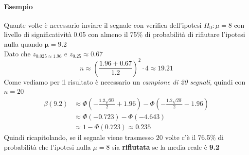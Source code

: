 \documentclass[]{article}
\begin{document}
    \paragraph{Esempio} Quante volte è necessario inviare il segnale con verifica dell'ipotesi $H_0 : \mu = 8$ con livello di significatività 0.05 con almeno il 75\% di probabilità di rifiutare l'ipotesi nulla quando $\boldsymbol{\mu = 9.2}$ \\
    Dato che $z_{0.025 \approx 1.96}$ e $z_{0.25} \approx 0.67$ 
    \[ n \approx \left( \frac{1.96 + 0.67}{1.2} \right)^2 \cdot 4 \approx 19.21 \]
    Come vediamo per il risultato è necessario un \textit{campione di 20 segnali}, quindi con $n=20$
    \begin{equation*}
        \begin{split}
            \beta(9.2) &\approx \Phi \left( - \frac{1.2 \sqrt{20}}{2} + 1.96 \right) - \Phi \left( - \frac{1.2 \sqrt{20}}{2} - 1.96 \right) \\
            &\approx \Phi(-0.723) - \Phi(-4.643) \\
            &\approx 1 - \Phi(0.723) \approx \boldsymbol{0.235}
        \end{split}
    \end{equation*}
    Quindi ricapitolando, se il segnale viene trasmesso 20 volte c'è il 76.5\% di probabilità che l'ipotesi nulla $\mu = 8$ sia \textbf{rifiutata} se la media reale è \textbf{9.2}
\end{document}
